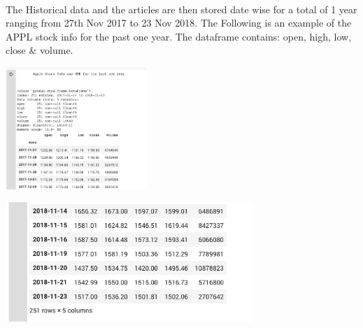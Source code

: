 \documentclass[12pt]{article}
\begin{document}
\\
The Historical data and the articles are then stored date wise for a total of 1 year ranging from 27th Nov 2017 to 23 Nov 2018. The Following is an example of the APPL stock info for the past one year. The dataframe contains: open, high, low, close & volume.
\begin{left}
\includegraphics[width=0.4\textwidth]{Stock_dataf.png}
\end{left}
\begin{right}
\includegraphics[width=0.7\textwidth]{Stock_dataf2.png}
\end{right}
\\
\end{document}
